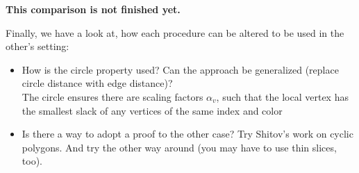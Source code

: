 \textbf{This comparison is not finished yet.}

Finally, we have a look at, how each procedure can be altered to be used in the other's setting:

\begin{itemize}
  \item How is the circle property used? Can the approach be generalized (replace circle distance with edge distance)?\\
  The circle ensures there are scaling factors $\alpha_v$, such that the local vertex has the smallest slack of any vertices of the same index and color
  \item Is there a way to adopt a proof to the other case? Try Shitov's work on cyclic polygons. And try the other way around (you may have to use thin slices, too).
\end{itemize}
